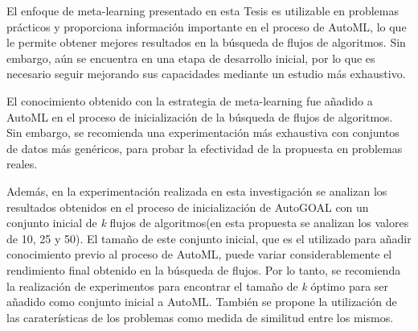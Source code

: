 \begin{recomendations}
    El enfoque de meta-learning presentado en esta Tesis es utilizable en
    problemas prácticos y proporciona información importante en el proceso de
    AutoML, lo que le permite obtener mejores resultados en la búsqueda de
    flujos de algoritmos. Sin embargo, aún se encuentra en una etapa de
    desarrollo inicial, por lo que es necesario seguir mejorando sus capacidades
    mediante un estudio más exhaustivo.

    El conocimiento obtenido con la estrategia de meta-learning fue añadido a
    AutoML en el proceso de inicialización de la búsqueda de flujos de
    algoritmos. Sin embargo, se recomienda una experimentación más exhaustiva
    con conjuntos de datos más genéricos, para probar la efectividad de la
    propuesta en problemas reales.

    Además, en la experimentación realizada en esta investigación se analizan
    los resultados obtenidos en el proceso de inicialización de AutoGOAL con un
    conjunto inicial de \emph{k} flujos de algoritmos(en esta propuesta se
    analizan los valores de 10, 25 y 50). El tamaño de este conjunto inicial,
    que es el utilizado para añadir conocimiento previo al proceso de
    AutoML, puede variar considerablemente el rendimiento final obtenido en la
    búsqueda de flujos. Por lo tanto, se recomienda la realización
    de experimentos para encontrar el tamaño de \emph{k} óptimo para ser
    añadido como conjunto inicial a AutoML. También se propone la utilización
    de las caraterísticas de los problemas como medida de similitud entre los
    mismos. 
\end{recomendations}
